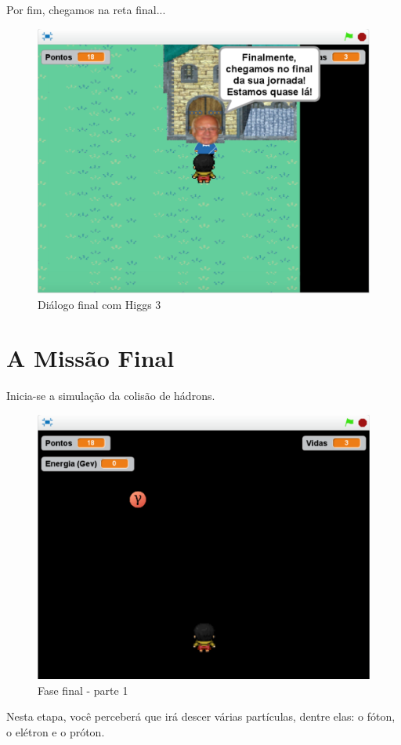 \documentclass[12pt,fleqn]{book} %
\begin{document}
Por fim, chegamos na reta final...

\begin{figure}[h]
	\centering
	\includegraphics[width=0.65 \textwidth]{Produto/jogo_19}
	\caption{Diálogo final com Higgs 3}
	\label{fig:app_a:jogo19}
\end{figure}

\newpage

\section{A Missão Final}

Inicia-se a simulação da colisão de hádrons.

\begin{figure}[h]
	\centering
	\includegraphics[width=0.65 \textwidth]{Produto/final1}
	\caption{Fase final - parte 1}
	\label{fig:app_a:final1}
\end{figure}

Nesta etapa, você perceberá que irá descer várias partículas, dentre elas: o fóton, o elétron e o próton.
\end{document}
